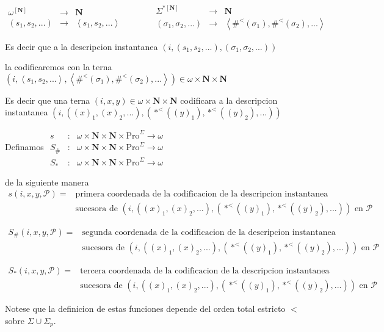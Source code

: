 \(\displaystyle \begin{array}{rcl} \omega ^{\left[ \mathbf{N}\right] } & \rightarrow & \mathbf{N} \\ (s_{1},s_{2},...) & \rightarrow & \left\langle s_{1},s_{2},...\right\rangle \end{array} \;\;\;\;\;\;\;\;\;\;\;\; \begin{array}{rcl} \Sigma ^{\ast \left[ \mathbf{N}\right] } & \rightarrow & \mathbf{N} \\ (\sigma _{1},\sigma _{2},...) & \rightarrow & \left\langle \#^{< }(\sigma _{1}),\#^{< }(\sigma _{2}),...\right\rangle \end{array} \)

Es decir que a la descripcion instantanea
\(\displaystyle (i,(s_{1},s_{2},...),(\sigma _{1},\sigma _{2},...)) \)

la codificaremos con la terna
\(\displaystyle (i,\left\langle s_{1},s_{2},...\right\rangle ,\left\langle \#^{< }(\sigma _{1}),\#^{< }(\sigma _{2}),...\right\rangle )\in \omega \times \mathbf{N} \times \mathbf{N} \)

Es decir que una terna \((i,x,y)\in \omega \times \mathbf{N}\times \mathbf{N}\) codificara a la descripcion instantanea
\(\displaystyle (i,((x)_{1},(x)_{2},...),(\ast ^{< }((y)_{1}),\ast ^{< }((y)_{2}),...)) \)

Definamos
\(\displaystyle \begin{array}{rcl} s & :& \omega \times \mathbf{N}\times \mathbf{N}\times \mathrm{Pro}^{\Sigma }\rightarrow \omega \\ S_{\#} & :& \omega \times \mathbf{N}\times \mathbf{N}\times \mathrm{Pro} ^{\Sigma }\rightarrow \omega \\ S_{\ast } & :& \omega \times \mathbf{N}\times \mathbf{N}\times \mathrm{Pro} ^{\Sigma }\rightarrow \omega \end{array} \)

de la siguiente manera
\(\displaystyle \begin{array}{ll} s(i,x,y,\mathcal{P})= & \text{primera coordenada de la codificacion de la descripcion instantanea} \\ & \text{sucesora de }(i,((x)_{1},(x)_{2},...),(\ast ^{< }((y)_{1}),\ast ^{< }((y)_{2}),...))\text{ en }\mathcal{P} \end{array} \)

\(\displaystyle \begin{array}{ll} S_{\#}(i,x,y,\mathcal{P})= & \text{segunda coordenada de la codificacion de la descripcion instantanea} \\ & \text{sucesora de }(i,((x)_{1},(x)_{2},...),(\ast ^{< }((y)_{1}),\ast ^{< }((y)_{2}),...))\text{ en }\mathcal{P} \end{array} \)

\(\displaystyle \begin{array}{ll} S_{\ast }(i,x,y,\mathcal{P})= & \text{tercera coordenada de la codificacion de la descripcion instantanea} \\ & \text{sucesora de }(i,((x)_{1},(x)_{2},...),(\ast ^{< }((y)_{1}),\ast ^{< }((y)_{2}),...))\text{ en }\mathcal{P} \end{array} \)

Notese que la definicion de estas funciones depende del orden total estricto \(< \) sobre \(\Sigma \cup \Sigma _{p}\).
